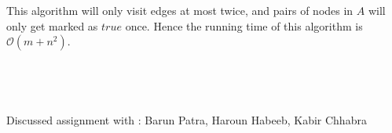 \documentclass[]{article}
\begin{document}
This algorithm will only visit edges at most twice, and pairs of nodes in $A$ will only get marked as $true$ once. Hence the running time of this algorithm is $\mathcal{O}(m+n^2)$.
\\
\\
\\
\\
\\
Discussed assignment with : Barun Patra, Haroun Habeeb, Kabir Chhabra
\end{document}

